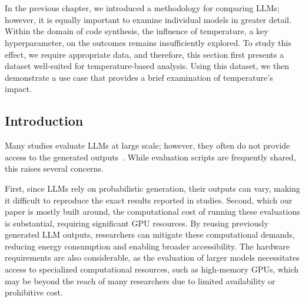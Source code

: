 
\newenvironment{ieeepromptbox}
{\def\FrameCommand{\fboxrule=1pt \fcolorbox{black}{lightgraybox}}%
	\MakeFramed{\advance\hsize-\width \FrameRestore}%
	\noindent\textbf{LLM Prompt}\par\vspace{0.5em}}
{\endMakeFramed}

\chapter{\thesispointtwouf}
\label{chapter_4}

In the previous chapter, we introduced a methodology for comparing LLMs; however, it is equally important to examine individual models in greater detail.
Within the domain of code synthesis, the influence of temperature, a key hyperparameter, on the outcomes remains insufficiently explored.
To study this effect, we require appropriate data, and therefore, this section first presents a dataset well-suited for temperature-based analysis.
Using this dataset, we then demonstrate a use case that provides a brief examination of temperature’s impact.

\section{Introduction}
\label{th4:section:introduction}

Many studies evaluate LLMs at large scale; however, they often do not provide access to the generated outputs~\cite{data_no_share_1,data_no_share_2,data_no_share_3,data_no_share_4,data_no_share_5}.
While evaluation scripts are frequently shared, this raises several concerns.

First, since LLMs rely on probabilistic generation, their outputs can vary, making it difficult to reproduce the exact results reported in studies.
Second, which our paper is mostly built around, the computational cost of running these evaluations is substantial, requiring significant GPU resources.
By reusing previously generated LLM outputs, researchers can mitigate these computational demands, reducing energy consumption and enabling broader accessibility.
The hardware requirements are also considerable, as the evaluation of larger models necessitates access to specialized computational resources, such as high-memory GPUs, which may be beyond the reach of many researchers due to limited availability or prohibitive cost.

